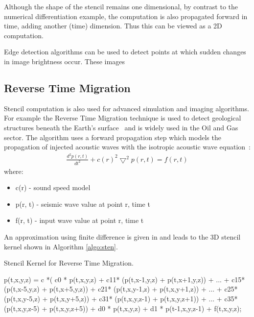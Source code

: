 Although the shape of the stencil remains one dimensional, by contrast to
the numerical differentiation example, the computation is also
propagated forward in time, adding another (time) dimension. Thus this
can be viewed as a 2D computation.


Edge detection algorithms can be used to detect points at which sudden
changes in image brightness occur. These images

\subsection{Reverse Time Migration}

Stencil computation is also used for advanced simulation and imaging
algorithms. For example the Reverse Time Migration technique is used
to detect geological structures beneath the Earth's
surface~\cite{baysal1983reverse} and is widely used in the Oil and Gas
sector. The algorithm uses a forward propagation step which models the
propagation of injected acoustic waves with the isotropic acoustic
wave equation~\cite{araya2011assessing}:
\begin{align}
  \frac{d^2p(r,t)}{dt^2} + {c(r)}^2\bigtriangledown^2p(r,t) = f(r,t)
\end{align}
where:
\begin{itemize}
\item c(r)    - sound speed model
\item p(r, t) - seismic wave value at point r, time t
\item f(r, t) - input wave value at point r, time t
\end{itemize}

An approximation using finite difference is given in
\cite{xinyu2013selfaware} and leads to the 3D stencil kernel
\cite{Xinyu:Qiwei:Luk:Qiang:Pell:2012} shown in Algorithm
\ref{algo:sten}.
\begin{algorithm}[!ht]\footnotesize
  \caption{Stencil Kernel for Reverse Time Migration.}
  \label{algo:sten}
  \begin{algorithmic}
    \State p(t,x,y,z) = c *(
    \State c0 * p(t,x,y,z) +
    \State c11* (p(t,x-1,y,z) + p(t,x+1,y,z)) + ... + c15*(p(t,x-5,y,z) + p(t,x+5,y,z)) +
    \State c21* (p(t,x,y-1,z) + p(t,x,y+1,z)) + ... + c25*(p(t,x,y-5,z) + p(t,x,y+5,z)) +
    \State c31* (p(t,x,y,z-1) + p(t,x,y,z+1)) + ... + c35*(p(t,x,y,z-5) + p(t,x,y,z+5)) +
    \State d0 *  p(t,x,y,z) + d1 * p(t-1,x,y,z-1) + f(t,x,y,z);
    \EndFor
    \EndFor
    \EndFor
    \EndFor
  \end{algorithmic}
\end{algorithm}


